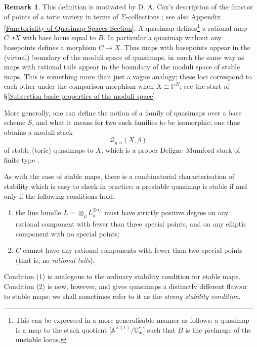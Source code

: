 \documentclass[11pt]{amsart}
\newcommand{\Q}[4]{\mathcal{Q}_{#1,#2}(#3,#4)}
\newcommand{\PP}{\mathbb P}
\renewcommand{\to}{\rightarrow}
\newcommand{\Gm}{\mathbb{G}_{\text{m}}}
\theoremstyle{definition}
\theoremstyle{definition}
\newtheorem{remark}[thm]{Remark}
\newcommand{\ilemph}[1]{\emph{#1}}
\begin{document}
\begin{remark} This definition is motivated by D. A. Cox's description of the functor of points of a toric variety in terms of $\Sigma$-collections \cite{CoxFunctor}; see also Appendix \ref{Functoriality of Quasimap Spaces Section}. A quasimap defines\footnote{This can be expressed in a more generalisable manner as follows: a quasimap is a map to the stack quotient $\big[\mathbb{A}^{\Sigma(1)} / \Gm^r\big]$ such that $B$ is the preimage of the unstable locus.} a rational map $C \dashrightarrow X$ with base locus equal to $B$.
In particular a quasimap without any basepoints defines a morphism $C \to X$. Thus maps with basepoints appear in the (virtual) boundary of the moduli space of quasimaps, in much the same way as maps with rational tails appear in the boundary of the moduli space of stable maps. This is something more than just a vague analogy; these loci correspond to each other under the comparison morphism when $X\cong\PP^N$; see the start of \S \ref{Subsection basic properties of the moduli space}. \end{remark}

More generally, one can define the notion of a family of quasimaps over a base scheme $S$, and what it means for two such families to be isomorphic; one thus obtains a moduli stack
\begin{equation*} \Q{g}{n}{X}{\beta} \end{equation*}
of stable (toric) quasimaps to $X$, which is a proper Deligne--Mumford stack of finite type \cite[\S 3]{CF-K}.

\medskip

As with the case of stable maps, there is a combinatorial characterisation of stability which is easy to check in practice; a prestable quasimap is stable if and only if the following conditions hold:
\begin{enumerate}
\item the line bundle $L = \otimes_\rho L_\rho^{\otimes \alpha_\rho}$ must have strictly positive degree on any rational component with fewer than three special points, and on any elliptic component with no special points;
\item $C$ cannot have any rational components with fewer than two special points (that is, no \emph{rational tails}).
\end{enumerate}
Condition (1) is analogous to the ordinary stability condition for stable maps. Condition (2) is new, however, and gives quasimaps a distinctly different flavour to stable maps; we shall sometimes refer to it as the \ilemph{strong stability condition}. 
\end{document}
